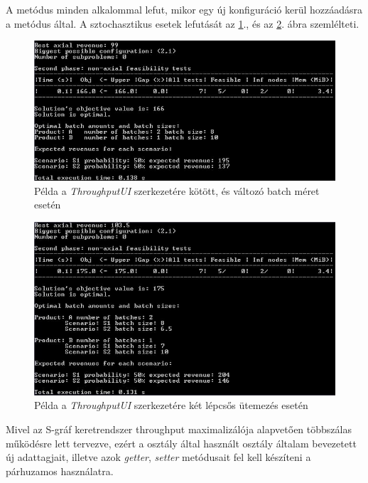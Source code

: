 A  metódus minden alkalommal lefut, mikor egy új konfiguráció kerül hozzáadásra a  metódus által.
A sztochasztikus esetek lefutását az \ref{ThroughputUIFixedVar}., és az \ref{ThroughputUITwoStage}. ábra szemlélteti.
\begin{figure}[H]
\begin{center}
\includegraphics[scale=0.9]{throughputUIFixedVar}
\caption{Példa a \textit{ThroughputUI} szerkezetére kötött, és változó batch méret esetén}
\label{ThroughputUIFixedVar}
\end{center}
\end{figure}
\begin{figure}[H]
\begin{center}
\includegraphics[scale=0.9]{throughputUITwoStage}
\caption{Példa a \textit{ThroughputUI} szerkezetére két lépcsős ütemezés esetén}
\label{ThroughputUITwoStage}
\end{center}
\end{figure}
Mivel az S-gráf keretrendszer throughput maximalizálója alapvetően többszálas működésre lett tervezve, ezért a  osztály által használt  osztály általam bevezetett új adattagjait, illetve azok \textit{getter}, \textit{setter} metódusait fel kell készíteni a párhuzamos használatra.

